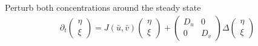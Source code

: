 \begin{frame}{Perturb both concentrations around the steady state}
  {\color{HydraWhite}\bfseries\fontsize{9.2}{11.6}\selectfont
  \begin{align*}
    \boxed{
      \partial_t
      \begin{pmatrix}
        \eta\\
        \xi
      \end{pmatrix}
      =
      J(\bar u,\bar v)
      \begin{pmatrix}
        \eta\\
        \xi
      \end{pmatrix}
      +
      \begin{pmatrix}
        D_u&0\\
        0&D_v
      \end{pmatrix}
      \Delta
      \begin{pmatrix}
        \eta\\
        \xi
      \end{pmatrix}
    }
  \end{align*}
  }

\end{frame}


